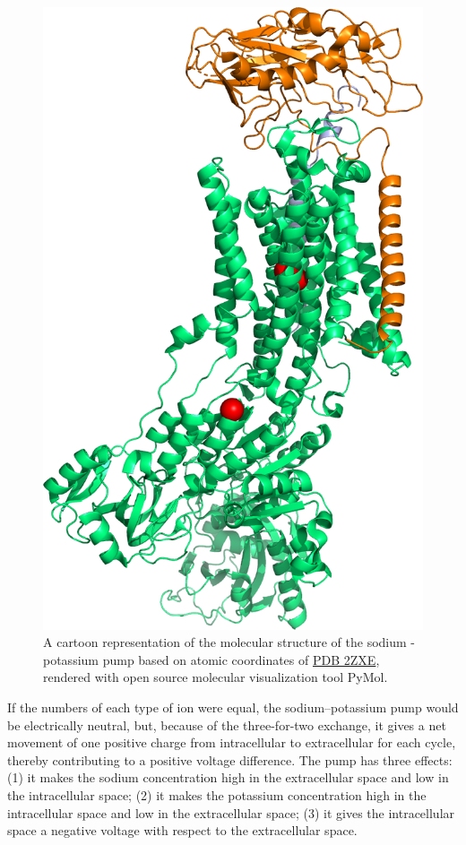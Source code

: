 \begin{figure}

{\centering \includegraphics[width=0.7\linewidth]{./figures/potential/Na_K_pump} 

}

\caption{A cartoon representation of the molecular structure of the sodium - potassium pump based on atomic coordinates of \href{https://www.rcsb.org/structure/2ZXE}{PDB 2ZXE}, rendered with open source molecular visualization tool PyMol.}\label{fig:nakpump}
\end{figure}

If the numbers of each type of ion were equal, the sodium--potassium pump would be electrically neutral, but, because of the three-for-two exchange, it gives a net movement of one positive charge from intracellular to extracellular for each cycle, thereby contributing to a positive voltage difference. The pump has three effects: (1) it makes the sodium concentration high in the extracellular space and low in the intracellular space; (2) it makes the potassium concentration high in the intracellular space and low in the extracellular space; (3) it gives the intracellular space a negative voltage with respect to the extracellular space.

